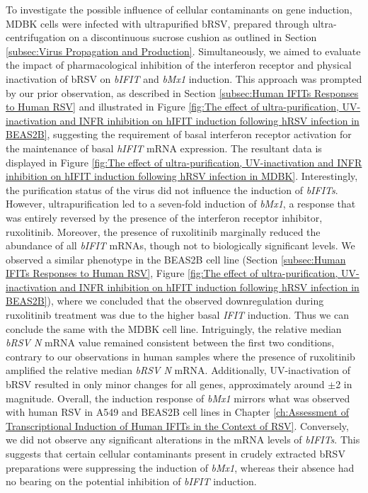To investigate the possible influence of cellular contaminants on gene induction, MDBK cells were infected with ultrapurified bRSV, prepared through ultra-centrifugation on a discontinuous sucrose cushion as outlined in Section \ref{subsec:Virus Propagation and Production}. Simultaneously, we aimed to evaluate the impact of pharmacological inhibition of the interferon receptor and physical inactivation of bRSV on \textit{bIFIT} and \textit{bMx1} induction. This approach was prompted by our prior observation, as described in Section \ref{subsec:Human IFITs Responses to Human RSV} and illustrated in Figure \ref{fig:The effect of ultra-purification, UV-inactivation and INFR inhibition on hIFIT induction following hRSV infection in BEAS2B}, suggesting the requirement of basal interferon receptor activation for the maintenance of basal \textit{hIFIT} mRNA expression. The resultant data is displayed in Figure \ref{fig:The effect of ultra-purification, UV-inactivation and INFR inhibition on hIFIT induction following hRSV infection in MDBK}. Interestingly, the purification status of the virus did not influence the induction of \textit{bIFITs}. However, ultrapurification led to a seven-fold induction of \textit{bMx1}, a response that was entirely reversed by the presence of the interferon receptor inhibitor, ruxolitinib. Moreover, the presence of ruxolitinib marginally reduced the abundance of all \textit{bIFIT} mRNAs, though not to biologically significant levels. We observed a similar phenotype in the BEAS2B cell line (Section \ref{subsec:Human IFITs Responses to Human RSV}, Figure \ref{fig:The effect of ultra-purification, UV-inactivation and INFR inhibition on hIFIT induction following hRSV infection in BEAS2B}), where we concluded that the observed downregulation during ruxolitinib treatment was due to the higher basal \textit{IFIT} induction. Thus we can conclude the same with the MDBK cell line. Intriguingly, the relative median \textit{bRSV N} mRNA value remained consistent between the first two conditions, contrary to our observations in human samples where the presence of ruxolitinib amplified the relative median \textit{bRSV N} mRNA. Additionally, UV-inactivation of bRSV resulted in only minor changes for all genes, approximately around \(\pm\)2 in magnitude. Overall, the induction response of \textit{bMx1} mirrors what was observed with human RSV in A549 and BEAS2B cell lines in Chapter \ref{ch:Assessment of Transcriptional Induction of Human IFITs in the Context of RSV}. Conversely, we did not observe any significant alterations in the mRNA levels of \textit{bIFITs}. This suggests that certain cellular contaminants present in crudely extracted bRSV preparations were suppressing the induction of \textit{bMx1}, whereas their absence had no bearing on the potential inhibition of \textit{bIFIT} induction.


